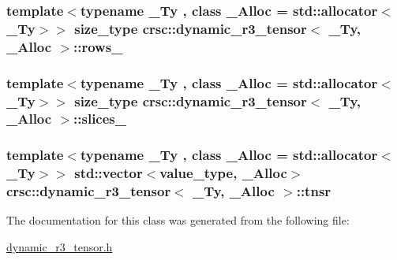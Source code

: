 \subsubsection[{\texorpdfstring{rows\+\_\+}{rows_}}]{\setlength{\rightskip}{0pt plus 5cm}template$<$typename \+\_\+\+Ty , class \+\_\+\+Alloc  = std\+::allocator$<$\+\_\+\+Ty$>$$>$ {\bf size\+\_\+type} {\bf crsc\+::dynamic\+\_\+r3\+\_\+tensor}$<$ \+\_\+\+Ty, \+\_\+\+Alloc $>$\+::rows\+\_\+\hspace{0.3cm}{\ttfamily [private]}}\hypertarget{classcrsc_1_1dynamic__r3__tensor_a737d9127d05b3c2537c96c19d813f64c}{}\label{classcrsc_1_1dynamic__r3__tensor_a737d9127d05b3c2537c96c19d813f64c}
\subsubsection[{\texorpdfstring{slices\+\_\+}{slices_}}]{\setlength{\rightskip}{0pt plus 5cm}template$<$typename \+\_\+\+Ty , class \+\_\+\+Alloc  = std\+::allocator$<$\+\_\+\+Ty$>$$>$ {\bf size\+\_\+type} {\bf crsc\+::dynamic\+\_\+r3\+\_\+tensor}$<$ \+\_\+\+Ty, \+\_\+\+Alloc $>$\+::slices\+\_\+\hspace{0.3cm}{\ttfamily [private]}}\hypertarget{classcrsc_1_1dynamic__r3__tensor_aa7f93a1920c579b47fe3c9c2380ae53a}{}\label{classcrsc_1_1dynamic__r3__tensor_aa7f93a1920c579b47fe3c9c2380ae53a}
\subsubsection[{\texorpdfstring{tnsr}{tnsr}}]{\setlength{\rightskip}{0pt plus 5cm}template$<$typename \+\_\+\+Ty , class \+\_\+\+Alloc  = std\+::allocator$<$\+\_\+\+Ty$>$$>$ std\+::vector$<${\bf value\+\_\+type}, \+\_\+\+Alloc$>$ {\bf crsc\+::dynamic\+\_\+r3\+\_\+tensor}$<$ \+\_\+\+Ty, \+\_\+\+Alloc $>$\+::tnsr\hspace{0.3cm}{\ttfamily [private]}}\hypertarget{classcrsc_1_1dynamic__r3__tensor_ab67d8f937b860e12cb09ae613062f14e}{}\label{classcrsc_1_1dynamic__r3__tensor_ab67d8f937b860e12cb09ae613062f14e}


The documentation for this class was generated from the following file\+:\begin{DoxyCompactItemize}
\item 
\hyperlink{dynamic__r3__tensor_8h}{dynamic\+\_\+r3\+\_\+tensor.\+h}\end{DoxyCompactItemize}

